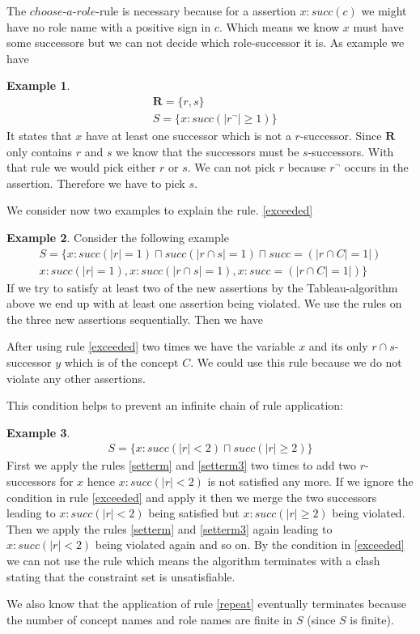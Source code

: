 \documentclass[a4paper,11pt]{scrartcl}
\theoremstyle{break}
\theoremstyle{definition}
\newtheorem{ex}{Example}
\begin{document}
The $choose$-$a$-$role$-rule is necessary because for a assertion $x:succ(c)$ we might have no role name with a positive sign in $c$. Which means we know $x$ must have some successors but we can not decide which role-successor it is. As example we have
\begin{ex}
\begin{align*}
&\mathbf{R}=\{r,s\}\\
&S=\{x:succ(|r^\neg|\geq 1)\}
\end{align*}
It states that $x$ have at least one successor which is not a $r$-successor. Since $\mathbf{R}$ only contains $r$ and $s$ we know that the successors must be $s$-successors. With that rule we would pick either $r$ or $s$. We can not pick $r$ because $r^\neg$ occurs in the assertion. Therefore we have to pick $s$.
\end{ex}
We consider now two examples to explain the rule. \ref{exceeded}
\begin{ex}
Consider the following example 
\begin{align*}
S=\{x:succ(|r|=1)\sqcap succ(|r\cap s|=1)\sqcap succ=(|r\cap C|=1|)\\
x:succ(|r|=1), x:succ(|r\cap s|=1), x:succ=(|r\cap C|=1|)
\}
\end{align*}
If we try to satisfy at least two of the new assertions by the Tableau-algorithm above we end up with at least one assertion being violated. We use the rules on the three new assertions sequentially. Then we have 
\begin{figure}[H]
\centering
{}
\end{figure}
After using rule \ref{exceeded} two times we have the variable $x$ and its only $r\cap s$-successor $y$ which is of the concept $C$. We could use this rule because we do not violate any other assertions. 
\end{ex}
This condition helps to prevent an infinite chain of rule application:
\begin{ex}
\begin{align*}
S=\{x:succ(|r|<2)\sqcap succ(|r|\geq 2)\}	
\end{align*}
First we apply the rules \ref{setterm} and \ref{setterm3} two times to add two $r$-successors for $x$ hence $x:succ(|r|<2)$ is not satisfied any more. If we ignore the condition in rule \ref{exceeded} and apply it then we merge the two successors leading to $x:succ(|r|<2)$ being satisfied but $x:succ(|r|\geq 2)$ being violated. Then we apply the rules \ref{setterm} and \ref{setterm3} again leading to $x:succ(|r|<2)$ being violated again and so on. By the condition in \ref{exceeded} we can not use the rule which means the algorithm terminates with a clash stating that the constraint set is unsatisfiable.
\end{ex}
We also know that the application of rule \ref{repeat} eventually terminates because the number of concept names and role names are finite in $S$ (since $S$ is finite).
\end{document}
